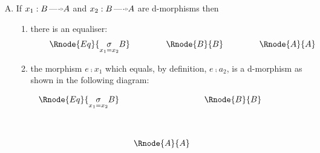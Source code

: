 \documentclass[10pt,a4paper]{scrartcl}
\begin{document}
\begin{enumerate} [A.,leftmargin=0.5cm]
\noindent then
$B_2[x_1|x_2]=B_1[x_2|x_1] = \fibrex{B_1}{B_2}{D}$ and $q(x_1,x_2)= x_2\sub x_1 $ and $q(x_2,x_1)= x_1 \sub x_2$
\noindent
so that we have:

\begin{center}
$
\begin{array}{cp{0cm}cp{0cm}c}
               && \Rnode{X}{\fibrex{x_1}{x_2}{D}}&&                \\ [1.2cm]
\Rnode{B1}{B_1}&&                                && \Rnode{B2}{B_2} \\ [1.2cm]
               &&\Rnode{A}{A}                    && 
\end{array}
$
\end{center}

\item {} If
$x_1:B \dmorph A$ and $x_2:B \dmorph A$ are d-morphisms then 

\begin{enumerate}[label*=\arabic*]
\item
{}
there is an equaliser: \\

$$
\setlength{\arraycolsep}{.75cm}
\begin{array}{ccc}
\Rnode{Eq}{\underset{x_1=x_2}{\sigma}B} & \Rnode{B}{B}  & \Rnode{A}{A} \\
\end{array}
$$
\setlength{\saroffsetA}{4pt}
\setlength{\saroffsetB}{4pt}
\setlength{\saroffsetA}{-4pt}
\setlength{\saroffsetB}{-4pt}
\sarreset

\item
{}
 the morphism $e \comp x_1$ which equals, by definition, $e \comp a_2$,  is a d-morphism as shown
in the following diagram:
\vspace{.2cm}
\begin{center}
$
\setlength{\arraycolsep}{.3cm}
\begin{array}{ccc}
\Rnode{Eq}{\underset{x_1=x_2}{\sigma}B} & &\Rnode{B}{B} \\[1.4cm]
 & \Rnode{A}{A} &\\
\end{array}
$

\setlength{\saroffsetA}{4pt}
\setlength{\saroffsetB}{4pt}
\setlength{\saroffsetA}{-4pt}
\setlength{\saroffsetB}{-4pt}
\sarreset
\end{center}
 

\end{enumerate}
\end{enumerate}
\end{document}
